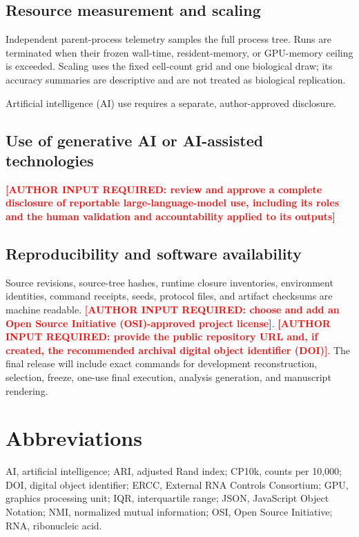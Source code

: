 \documentclass[pdflatex,sn-vancouver-num,referee,lineno]{sn-jnl}
\newcommand{\PendingAuthor}[1]{\textcolor{red}{\textbf{[AUTHOR INPUT REQUIRED: #1]}}}
\begin{document}
\subsection{Resource measurement and scaling}

Independent parent-process telemetry samples the full process tree. Runs are terminated when their frozen wall-time, resident-memory, or GPU-memory ceiling is exceeded. Scaling uses the fixed cell-count grid and one biological draw; its accuracy summaries are descriptive and are not treated as biological replication.

Artificial intelligence (AI) use requires a separate, author-approved disclosure.

\subsection{Use of generative AI or AI-assisted technologies}

\PendingAuthor{review and approve a complete disclosure of reportable large-language-model use, including its roles and the human validation and accountability applied to its outputs}

\subsection{Reproducibility and software availability}

Source revisions, source-tree hashes, runtime closure inventories, environment identities, command receipts, seeds, protocol files, and artifact checksums are machine readable. \PendingAuthor{choose and add an Open Source Initiative (OSI)-approved project license}. \PendingAuthor{provide the public repository URL and, if created, the recommended archival digital object identifier (DOI)}. The final release will include exact commands for development reconstruction, selection, freeze, one-use final execution, analysis generation, and manuscript rendering.

\section*{Abbreviations}

AI, artificial intelligence; ARI, adjusted Rand index; CP10k, counts per 10,000; DOI, digital object identifier; ERCC, External RNA Controls Consortium; GPU, graphics processing unit; IQR, interquartile range; JSON, JavaScript Object Notation; NMI, normalized mutual information; OSI, Open Source Initiative; RNA, ribonucleic acid.
\end{document}
